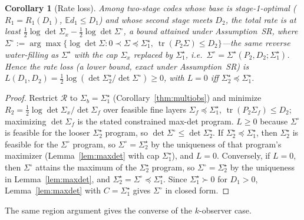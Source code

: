 \documentclass[11pt]{article}
\newtheorem{corollary}{Corollary}
\theoremstyle{definition}
\theoremstyle{remark}
\newcommand{\tr}{\operatorname{tr}}
\newcommand{\E}{\mathbb{E}}
\begin{document}
\begin{corollary}[Rate loss]\label{thm:multiobs-loss}
Among two-stage codes whose base is stage-1-optimal ($R_1=R_1(D_1)$, $\E d_1\le D_1$) and
whose second stage meets $D_2$, the total rate is at least $\tfrac12\log\det\Sigma_x-
\tfrac12\log\det\Sigma^\circ$, a bound attained under Assumption~SR, where $\Sigma^\circ:=\arg\max\{\log\det\Sigma:0\prec\Sigma
\preceq\Sigma_1^\star,\ \tr(P_2\Sigma)\le D_2\}$---the \emph{same} reverse water-filling
as $\Sigma^\star$ with the cap $\Sigma_x$ replaced by $\Sigma_1^\star$, i.e.\
$\Sigma^\circ=\Sigma^\star(P_2,D_2;\Sigma_1^\star)$. Hence the rate loss (a lower
bound, exact under Assumption~SR) is $L(D_1,D_2)=\tfrac12\log(\det\Sigma_2^\star/\det\Sigma^\circ)\ge0$, with $L=0$ iff
$\Sigma_2^\star\preceq\Sigma_1^\star$.
\end{corollary}
\begin{proof}
Restrict $\mathcal R$ to $\Sigma_b=\Sigma_1^\star$ (Corollary~\ref{thm:multiobs}) and
minimize $R_2=\tfrac12\log\det\Sigma_x/\det\Sigma_f$ over feasible fine layers
$\Sigma_f\preceq\Sigma_1^\star$, $\tr(P_2\Sigma_f)\le D_2$; maximizing $\det\Sigma_f$ is
the stated constrained max-det program. $L\ge0$ because $\Sigma^\circ$ is feasible for
the looser $\Sigma_2^\star$ program, so $\det\Sigma^\circ\le\det\Sigma_2^\star$. If
$\Sigma_2^\star\preceq\Sigma_1^\star$, then $\Sigma_2^\star$ is feasible for the
$\Sigma^\circ$ program, so $\Sigma^\circ=\Sigma_2^\star$ by the uniqueness of that program's
maximizer (Lemma~\ref{lem:maxdet} with cap $\Sigma_1^\star$), and $L=0$. Conversely, if $L=0$,
then $\Sigma^\circ$ attains the maximum of the $\Sigma_2^\star$ program, so
$\Sigma^\circ=\Sigma_2^\star$ by the uniqueness in Lemma~\ref{lem:maxdet}, and
$\Sigma_2^\star=\Sigma^\circ\preceq\Sigma_1^\star$. Since $\Sigma_1^\star\succ0$ for
$D_1>0$, Lemma~\ref{lem:maxdet} with $C=\Sigma_1^\star$ gives $\Sigma^\circ$ in closed form.
\end{proof}

The same region argument gives the converse of the $k$-observer case.
\end{document}
